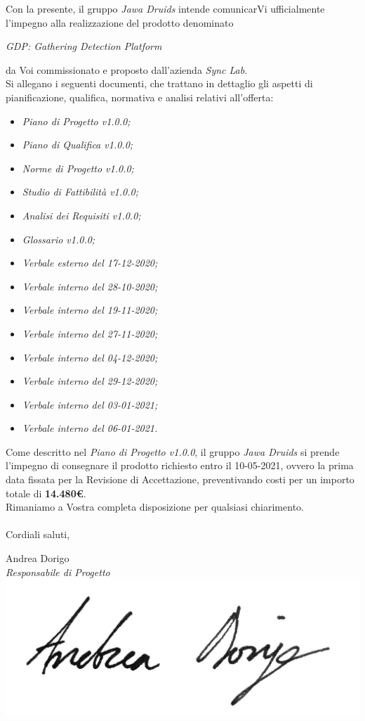 \documentclass[a4paper,12pt]{report}
\begin{document}
Con la presente, il gruppo \textit{Jawa Druids} intende comunicarVi ufficialmente l’impegno alla realizzazione del prodotto denominato
\begin{center}
  \textit{GDP: Gathering Detection Platform}
\end{center}
da Voi commissionato e proposto dall'azienda \textit{Sync Lab}.
\vspace{1cm}
\\
Si allegano i seguenti documenti, che trattano in dettaglio gli aspetti di pianificazione, qualifica, normativa e analisi relativi all'offerta:
\begin{itemize}
  \item \textit{Piano di Progetto v1.0.0;}
  \item \textit{Piano di Qualifica v1.0.0;}
  \item \textit{Norme di Progetto v1.0.0;}
  \item \textit{Studio di Fattibilità v1.0.0;}
  \item \textit{Analisi dei Requisiti v1.0.0;}
  \item \textit{Glossario v1.0.0;}
  \item \textit{Verbale esterno del 17-12-2020;}
  \item \textit{Verbale interno del 28-10-2020;}
  \item \textit{Verbale interno del 19-11-2020;}
  \item \textit{Verbale interno del 27-11-2020;}
  \item \textit{Verbale interno del 04-12-2020;}
  \item \textit{Verbale interno del 29-12-2020;}
  \item \textit{Verbale interno del 03-01-2021;}
  \item \textit{Verbale interno del 06-01-2021.}
\end{itemize}
\vspace{0.7cm}

Come descritto nel \textit{Piano di Progetto v1.0.0}, il gruppo \textit{Jawa Druids} si prende l’impegno di consegnare il prodotto richiesto entro il 10-05-2021, ovvero la prima data fissata per la Revisione di Accettazione, preventivando costi per un importo totale di \textbf{14.480\euro}.\\
Rimaniamo a Vostra completa disposizione per qualsiasi chiarimento.\\
\vspace{0.3cm}
\\
Cordiali saluti,
\begin{flushright}
  Andrea Dorigo \\
  \textit{Responsabile di Progetto} \\
  \includegraphics[width=0.3\linewidth]{immagini/firme/andrea_dorigo.jpg}\\[4ex]
\end{flushright}
\end{document}
